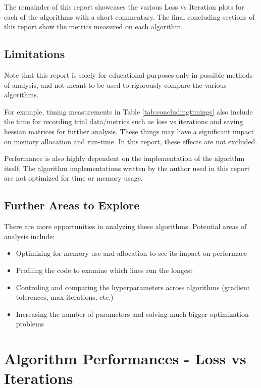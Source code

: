 \documentclass{article}
\begin{document}
    The remainder of this report showcases the various Loss vs Iteration plots for each of the algorithms with a short commentary.
    The final concluding sections of this report show the metrics measured on each algorithm.

    \subsection{Limitations}

    Note that this report is solely for educational purposes only in possible methods of analysis, 
    and not meant to be used to rigorously compare the various algorithms. 
    
    For example, timing measurements in Table \ref{tab:concludingtimings} also include the time for recording trial data/metrics such as loss vs iterations and saving hessian matrices for further analysis. 
    These things may have a significant impact on memory allocation and run-time. In this report, these effects are not excluded.

    Performance is also highly dependent on the implementation of the algorithm itself.
    The algorithm implementations written by the author used in this report are not optimized for time or memory usage.

    \subsection{Further Areas to Explore}

    There are more opportunities in analyzing these algorithms. Potential areas of analysis include:

    \begin{itemize}
        \item Optimizing for memory use and allocation to see its impact on performace
        \item Profiling the code to examine which lines run the longest
        \item Controling and comparing the hyperparameters across algorithms (gradient tolerences, max iterations, etc.)
        \item Increasing the number of parameters and solving much bigger optimization problems
    \end{itemize}

    \section{Algorithm Performances - Loss vs Iterations}
\end{document}
